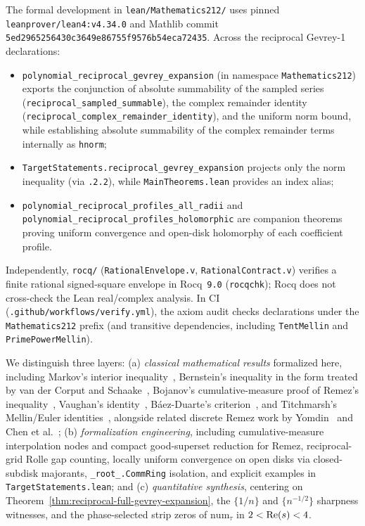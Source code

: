 \begin{remark}
\label{rem:crosswalk}
The formal development in \texttt{lean/\allowbreak Mathematics212/} uses pinned \texttt{leanprover/lean4:v4.34.0} and Mathlib commit \texttt{5ed29652\allowbreak 56430c36\allowbreak 49e86755\allowbreak f9576b54\allowbreak eca72435}. Across the reciprocal Gevrey-1 declarations:
\begin{itemize}\raggedright
  \item \texttt{polynomial\_reciprocal\_gevrey\_expansion} (in namespace \texttt{Mathematics212}) exports the conjunction of absolute summability of the sampled series (\texttt{reciprocal\_sampled\_summable}), the complex remainder identity (\texttt{reciprocal\_complex\_remainder\_identity}), and the uniform norm bound, while establishing absolute summability of the complex remainder terms internally as \texttt{hnorm};
  \item \texttt{TargetStatements.reciprocal\_gevrey\_expansion} projects only the norm inequality (via \texttt{.2.2}), while \texttt{MainTheorems.lean} provides an index alias;
  \item \texttt{polynomial\_reciprocal\_profiles\_all\_radii} and \texttt{polynomial\_reciprocal\_profiles\_holomorphic} are companion theorems proving uniform convergence and open-disk holomorphy of each coefficient profile.
\end{itemize}
Independently, \texttt{rocq/} (\texttt{RationalEnvelope.v}, \texttt{RationalContract.v}) verifies a finite rational signed-square envelope in Rocq~\texttt{9.0} (\texttt{rocqchk}); Rocq does not cross-check the Lean real/complex analysis. In CI (\texttt{.github/workflows/verify.yml}), the axiom audit checks declarations under the \texttt{Mathematics212} prefix (and transitive dependencies, including \texttt{TentMellin} and \texttt{PrimePowerMellin}).
\end{remark}

\begin{remark}
\label{rem:taxonomy}
We distinguish three layers: (a) \emph{classical mathematical results} formalized here, including Markov's interior inequality~\cite{markov1889}, Bernstein's inequality in the form treated by van der Corput and Schaake~\cite{vandercorput1935,vandercorput1936}, Bojanov's cumulative-measure proof of Remez's inequality~\cite{bojanov1993}, Vaughan's identity~\cite{vaughan1977}, B\'aez-Duarte's criterion~\cite{baez2003}, and Titchmarsh's Mellin/Euler identities~\cite{titchmarsh1986}, alongside related discrete Remez work by Yomdin~\cite{yomdin2009} and Chen et al.~\cite{chen2024}; (b) \emph{formalization engineering}, including cumulative-measure interpolation nodes and compact good-superset reduction for Remez, reciprocal-grid Rolle gap counting, locally uniform convergence on open disks via closed-subdisk majorants, \texttt{\_root\_.CommRing} isolation, and explicit examples in \texttt{TargetStatements.lean}; and (c) \emph{quantitative synthesis}, centering on Theorem~\ref{thm:reciprocal-full-gevrey-expansion}, the $\{1/n\}$ and $\{n^{-1/2}\}$ sharpness witnesses, and the phase-selected strip zeros of $\mathrm{num}_\tau$ in $2 < \operatorname{Re}(s) < 4$.
\end{remark}

